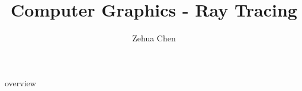 \documentclass[letterpaper, 11pt]{report}
\title{Computer Graphics - Ray Tracing}
\author{Zehua Chen}
\begin{document}
  \maketitle
  \tableofcontents

  {overview}

  \newpage
  \printglossary
\end{document}
